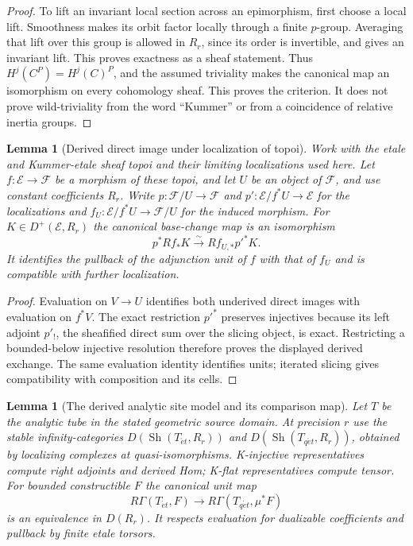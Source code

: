 \documentclass[11pt]{article}
\newtheorem{lemma}[theorem]{Lemma}
\theoremstyle{definition}
\theoremstyle{remark}
\begin{document}
\begin{proof}
To lift an invariant local section across an epimorphism, first choose
a local lift.  Smoothness makes its orbit factor locally through a
finite $p$-group.  Averaging that lift over this group is allowed in
$R_r$, since its order is invertible, and gives an invariant lift.
This proves exactness as a sheaf statement.  Thus
$H^j(C^P)=H^j(C)^P$, and the assumed triviality makes the canonical
map an isomorphism on every cohomology sheaf.  This proves the
criterion.  It does not prove wild-triviality from the word
``Kummer'' or from a coincidence of relative inertia groups.
\end{proof}

\begin{lemma}[Derived direct image under localization of topoi]
\label{lem:frag-slice-derived-base-change}
Work with the etale and Kummer-etale sheaf topoi and their limiting
localizations used here.  Let $f:\mathcal E\to\mathcal F$ be a
morphism of these topoi, and let $U$ be
an object of $\mathcal F$, and use constant coefficients $R_r$.
Write $p:\mathcal F/U\to\mathcal F$ and
$p':\mathcal E/f^*U\to\mathcal E$ for the localizations and
$f_U:\mathcal E/f^*U\to\mathcal F/U$ for the induced morphism.
For $K\in D^+(\mathcal E,R_r)$ the canonical base-change map is an
isomorphism
\[
 p^*Rf_*K\xrightarrow{\sim}Rf_{U,*}p'^*K.
\]
It identifies the pullback of the adjunction unit of $f$ with that
of $f_U$ and is compatible with further localization.
\end{lemma}

\begin{proof}
Evaluation on $V\to U$ identifies both underived direct images with
evaluation on $f^*V$.  The exact restriction $p'^*$ preserves
injectives because its left adjoint $p'_!$, the sheafified direct
sum over the slicing object, is exact.  Restricting a bounded-below
injective resolution therefore proves the displayed derived exchange.
The same evaluation identity identifies units; iterated slicing
gives compatibility with composition and its cells.
\end{proof}

\begin{lemma}[The derived analytic site model and its comparison map]
\label{lem:frag-derived-analytic-site-model}
Let $T$ be the analytic tube in the stated geometric source domain.
At precision $r$ use the stable infinity-categories
$D(\operatorname{Sh}(T_{\acute et},R_r))$ and
$D(\operatorname{Sh}(T_{q\acute et},R_r))$, obtained by localizing
complexes at quasi-isomorphisms.  K-injective representatives compute
right adjoints and derived Hom; K-flat representatives compute tensor.
For bounded constructible $F$ the canonical unit map
\[
 R\Gamma(T_{\acute et},F)\longrightarrow
 R\Gamma(T_{q\acute et},\mu^*F)
\]
is an equivalence in $D(R_r)$.  It respects evaluation for dualizable
coefficients and pullback by finite etale torsors.
\end{lemma}
\end{document}
